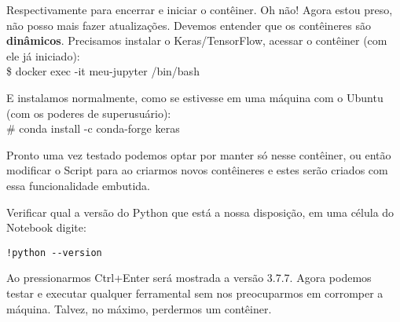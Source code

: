 Respectivamente para encerrar e iniciar o contêiner. Oh não! Agora estou preso, não posso mais fazer atualizações. Devemos entender que os contêineres são \textbf{dinâmicos}. Precisamos instalar o Keras/TensorFlow, acessar o contêiner (com ele já iniciado): \\
{\ttfamily\$ docker exec -it meu-jupyter /bin/bash}

E instalamos normalmente, como se estivesse em uma máquina com o Ubuntu (com os poderes de superusuário): \\
{\ttfamily\# conda install -c conda-forge keras}

Pronto uma vez testado podemos optar por manter só nesse contêiner, ou então modificar o Script para ao criarmos novos contêineres e estes serão criados com essa funcionalidade embutida.

Verificar qual a versão do Python que está a nossa disposição, em uma célula do Notebook digite:
\begin{lstlisting}[]
!python --version
\end{lstlisting}

Ao pressionarmos Ctrl+Enter será mostrada a versão 3.7.7. Agora podemos testar e executar qualquer ferramental sem nos preocuparmos em corromper a máquina. Talvez, no máximo, perdermos um contêiner.
	
\clearpage